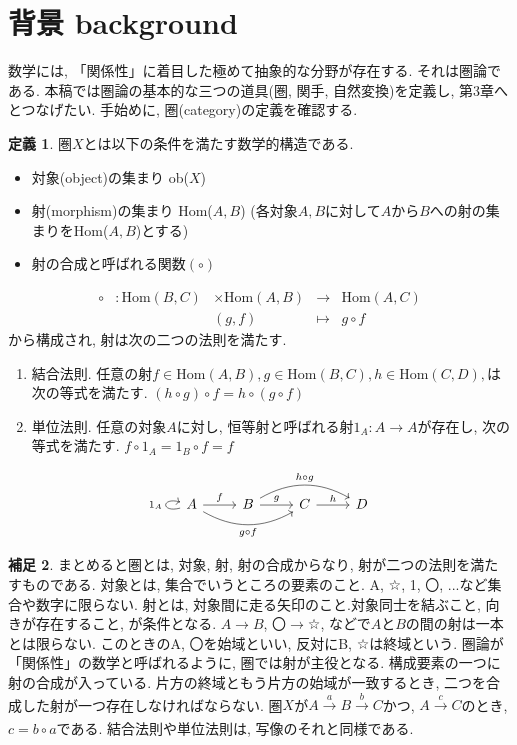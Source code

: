 \documentclass[a4paper]{jsarticle}
\theoremstyle{definition}
\newtheorem{dfn}{定義}[section]
\newtheorem{hsk}[dfn]{補足}
\newcommand{\Hom}{{\mathrm{Hom}}}
\begin{document}
\section{背景 background}
数学には, 「関係性」に着目した極めて抽象的な分野が存在する. それは圏論である. 本稿では圏論の基本的な三つの道具(圏, 関手, 自然変換)を定義し, 第3章へとつなげたい. 手始めに, 圏(category)の定義を確認する.
\begin{dfn}
圏$X$とは以下の条件を満たす数学的構造である. 
\begin{itemize}
    \item 対象(object)の集まり ob($X$)
    \item 射(morphism)の集まり Hom($A,B$)
    (各対象$A, B$に対して$A$から$B$への射の集まりをHom($A, B$)とする)
    \item 射の合成と呼ばれる関数$(\circ)$
\end{itemize}
\begin{equation}
    \begin{array}{lllll}
     \circ &: \Hom (B, C) &\times \Hom (A, B) &\rightarrow &\Hom (A, C)  \\
         &    & (g,f) & \mapsto&  g\circ f
\end{array}
\end{equation}
から構成され, 射は次の二つの法則を満たす.
\begin{enumerate}[(1)]
    \item 結合法則. 任意の射$f\in \Hom(A,B), g\in \Hom(B,C), h\in \Hom(C,D),$は次の等式を満たす. $(h \circ g) \circ f = h \circ (g \circ f)$  
    \item 単位法則. 任意の対象$A$に対し, 恒等射と呼ばれる射$1_A:A\rightarrow A$が存在し, 次の等式を満たす.  $f\circ 1_A = 1_B\circ f = f$  
\end{enumerate}
\begin{equation}
    \begin{tikzcd}
    A\ar{r}{f} \ar[loop left,"1_A"] \ar[bend right=30,swap]{rr}{g\circ f}& B\ar{r}{g} \ar[bend left=30]{rr}{h\circ g}& C\ar{r}{h} & D
\end{tikzcd}
\end{equation}
\end{dfn}

\begin{hsk}
まとめると圏とは, 対象, 射, 射の合成からなり, 射が二つの法則を満たすものである.
対象とは, 集合でいうところの要素のこと. A, ☆, 1, 〇, ...など集合や数字に限らない.
射とは, 対象間に走る矢印のこと.対象同士を結ぶこと, 向きが存在すること, が条件となる. $A \rightarrow B$, 〇$\rightarrow$☆, などで$A$と$B$の間の射は一本とは限らない. このときのA, 〇を始域といい, 反対にB, ☆は終域という. 圏論が「関係性」の数学と呼ばれるように, 圏では射が主役となる. 構成要素の一つに射の合成が入っている. 片方の終域ともう片方の始域が一致するとき, 二つを合成した射が一つ存在しなければならない. 圏$X$が$A\xrightarrow[]{a} B\xrightarrow[]{b} C$かつ, $A\xrightarrow[]{c} C$のとき, $c=b\circ a$である. 結合法則や単位法則は, 写像のそれと同様である. 
\\
\end{hsk}
\end{document}
